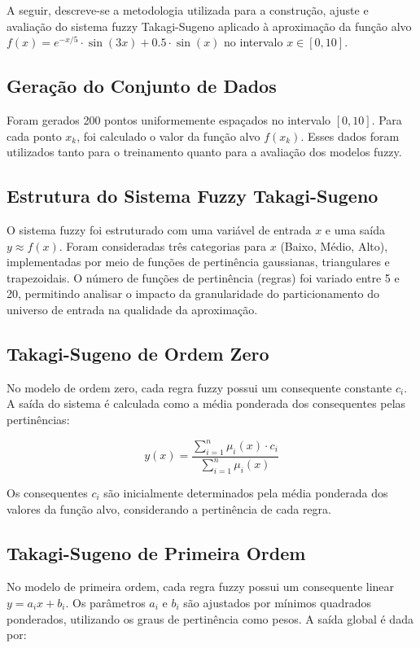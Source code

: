 A seguir, descreve-se a metodologia utilizada para a construção, ajuste e avaliação do sistema fuzzy Takagi-Sugeno aplicado à aproximação da função alvo $f(x) = e^{-x/5} \cdot \sin(3x) + 0.5 \cdot \sin(x)$ no intervalo $x \in [0, 10]$.

\subsection{Geração do Conjunto de Dados}

Foram gerados 200 pontos uniformemente espaçados no intervalo $[0, 10]$. Para cada ponto $x_k$, foi calculado o valor da função alvo $f(x_k)$. Esses dados foram utilizados tanto para o treinamento quanto para a avaliação dos modelos fuzzy.

\subsection{Estrutura do Sistema Fuzzy Takagi-Sugeno}

O sistema fuzzy foi estruturado com uma variável de entrada $x$ e uma saída $y \approx f(x)$. Foram consideradas três categorias para $x$ (Baixo, Médio, Alto), implementadas por meio de funções de pertinência gaussianas, triangulares e trapezoidais. O número de funções de pertinência (regras) foi variado entre 5 e 20, permitindo analisar o impacto da granularidade do particionamento do universo de entrada na qualidade da aproximação.

\subsection{Takagi-Sugeno de Ordem Zero}

No modelo de ordem zero, cada regra fuzzy possui um consequente constante $c_i$. A saída do sistema é calculada como a média ponderada dos consequentes pelas pertinências:

\[
y(x) = \frac{\sum_{i=1}^{n} \mu_i(x) \cdot c_i}{\sum_{i=1}^{n} \mu_i(x)}
\]

Os consequentes $c_i$ são inicialmente determinados pela média ponderada dos valores da função alvo, considerando a pertinência de cada regra.

\subsection{Takagi-Sugeno de Primeira Ordem}

No modelo de primeira ordem, cada regra fuzzy possui um consequente linear $y = a_i x + b_i$. Os parâmetros $a_i$ e $b_i$ são ajustados por mínimos quadrados ponderados, utilizando os graus de pertinência como pesos. A saída global é dada por:

